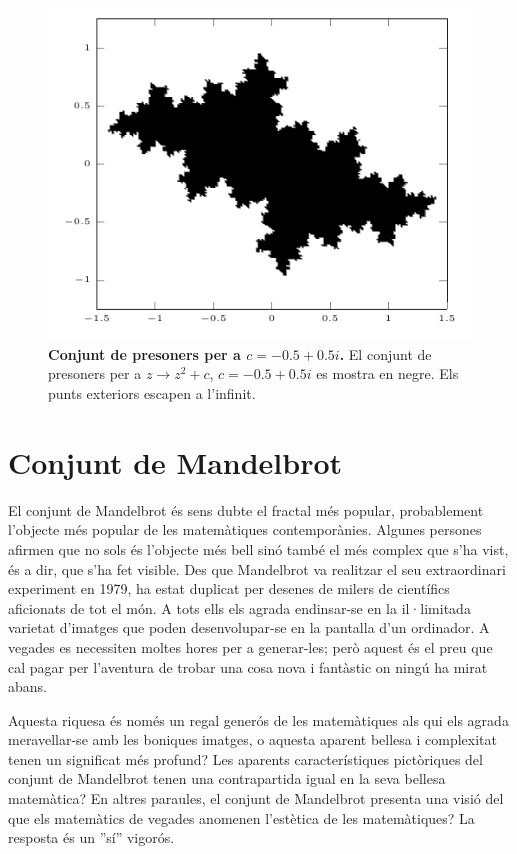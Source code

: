 \documentclass[12pt,a4paper]{report}
\begin{document}
\begin{figure}[!ht]
\centering
\includegraphics[scale=1]{img/img03_01_julia.pdf}
\caption{\textbf{Conjunt de presoners per a $c = -0.5 + 0.5i$.}
El conjunt de presoners per a $z \rightarrow z^{2} + c$, $c = -0.5 + 0.5i$ es mostra en negre. Els punts exteriors escapen a l'infinit.}
\label{fig13.15}
\end{figure}
\newpage
\section{Conjunt de Mandelbrot}
El conjunt de Mandelbrot és sens dubte el fractal més popular, probablement l'objecte més popular de les matemàtiques contemporànies. Algunes persones afirmen que no sols és l'objecte més bell sinó també el més complex que s'ha vist, és a dir, que s'ha fet visible. Des que Mandelbrot va realitzar el seu extraordinari experiment en 1979, ha estat duplicat per desenes de milers de científics aficionats de tot el món. A tots ells els agrada endinsar-se en la il·limitada varietat d'imatges que poden desenvolupar-se en la pantalla d'un ordinador. A vegades es necessiten moltes hores per a generar-les; però aquest és el preu que cal pagar per l'aventura de trobar una cosa nova i fantàstic on ningú ha mirat abans.

Aquesta riquesa és només un regal generós de les matemàtiques als qui els agrada meravellar-se amb les boniques imatges, o aquesta aparent bellesa i complexitat tenen un significat més profund? Les aparents característiques pictòriques del conjunt de Mandelbrot tenen una contrapartida igual en la seva bellesa matemàtica? En altres paraules, el conjunt de Mandelbrot presenta una visió del que els matemàtics de vegades anomenen l'estètica de les matemàtiques? La resposta és un ''sí'' vigorós.
\end{document}
